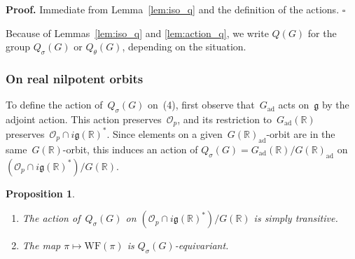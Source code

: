 \documentclass[10pt,leqno]{article}
\newtheorem{proposition}[equation]{Proposition}
\numberwithin{equation}{section}
\newcommand{\qed}{\hfill $\square$ \medskip}
\newenvironment{proof}[1][Proof]{\noindent\textbf{#1.} }{\qed}
\newcommand{\Gad}{G_\mathrm{ad}}
\renewcommand{\O}{\mathcal O}
\newcommand{\R}{\mathbb R}
\newcommand{\g}{\mathfrak g}
\newcommand{\WF}{\mathrm{WF}}
\newcommand{\Op}{\O_p}
\begin{document}
\begin{proof}
Immediate from Lemma~\ref{lem:iso_q} and the definition of the actions.
\end{proof}


Because of Lemmas~\ref{lem:iso_q} and \ref{lem:action_q}, we write $Q(G)$ for the group $Q_\sigma(G)$ or $Q_\theta(G)$, depending on the situation.



\subsubsection*{On real nilpotent orbits} 

To define the action of~$Q_{\sigma}(G)$ on~(4), first observe that~$\Gad$ acts on~$\g$ by the adjoint action. This action preserves~$\Op$, and its restriction to~$\Gad(\R)$ preserves~$\Op\cap i\g(\R)^*$. Since elements on a given~$G(\R)_{\mathrm{ad}}$-orbit are in the same~$G(\R)$-orbit, this induces an action of $Q_{\sigma}(G)=\Gad(\R)/G(\R)_{\mathrm{ad}}$ on~$(\Op\cap i\g(\R)^*)/G(\R)$.

\begin{proposition}\label{prop:action_on_real_orbits}
\begin{enumerate} 
\item The action of~$Q_{\sigma}(G)$ on $(\Op\cap i\g(\R)^*)/G(\R)$ is simply transitive.
\item The map $\pi \mapsto \WF(\pi)$ is $Q_{\sigma}(G)$-equivariant.
\end{enumerate}
\end{proposition}
\end{document}
